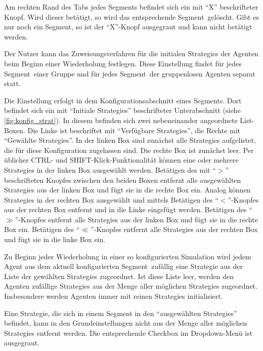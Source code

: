 \documentclass[parskip=full,11pt]{scrartcl}
\def\segment{Segment}
\begin{document}
Am rechten Rand des Tabs jedes \segment s befindet sich ein mit \enquote{X} beschrifteter Knopf. Wird dieser betätigt, so wird das entsprechende \segment\ gelöscht. Gibt es nur noch ein \segment, so ist der \enquote{X}-Knopf ausgegraut und kann nicht betätigt werden.

Der \Gls{Nutzer} kann das Zuweisungsverfahren für die initialen \Glspl{Strategie} der Agenten beim Beginn einer Wiederholung festlegen. Diese Einstellung findet für jedes \segment\ einer Gruppe und für jedes \segment\ der gruppenlosen Agenten separat statt.

Die Einstellung erfolgt in dem Konfigurationsabschnitt eines \segment s. Dort befindet sich ein mit \enquote{Initiale \Glspl{Strategie}} beschrifteter Unterabschnitt (siehe \cref{fig:konfig_strat}). In diesem befinden sich zwei nebeneinander angeordnete List-Boxen. Die Linke ist beschriftet mit \enquote{Verfügbare \Glspl{Strategie}}, die Rechte mit \enquote{Gewählte \Glspl{Strategie}}. In der linken Box sind zunächst alle \Glspl{Strategie} aufgelistet, die für diese \Gls{Konfiguration} zugelassen sind. Die rechte Box ist zunächst leer. Per üblicher \textsf{CTRL}- und \textsf{SHIFT}-Klick-Funktionalität können eine oder mehrere \Glspl{Strategie} in der linken Box ausgewählt werden. Betätigen des mit \enquote{\(>\)} beschrifteten Knopfes zwischen den beiden Boxen entfernt alle ausgewählten \Glspl{Strategie} aus der linken Box und fügt sie in die rechte Box ein. Analog können \Glspl{Strategie} in der rechten Box ausgewählt und mittels Betätigen des \enquote{\(<\)}-Knopfes aus der rechten Box entfernt und in die Linke eingefügt werden. Betätigen des \enquote{\(\gg\)}-Knopfes entfernt alle \Glspl{Strategie} aus der linken Box und fügt sie in die rechte Box ein. Betätigen des \enquote{\(\ll\)}-Knopfes entfernt alle \Glspl{Strategie} aus der rechten Box und fügt sie in die linke Box ein.

Zu Beginn jeder Wiederholung in einer so konfigurierten Simulation wird jedem Agent aus dem aktuell konfigurierten \segment\ zufällig eine \Gls{Strategie} aus der Liste der gewählten \Glspl{Strategie} zugeordnet. Ist diese Liste leer, werden den Agenten zufällige \Glspl{Strategie} aus der Menge aller möglichen \Glspl{Strategie} zugeordnet. Insbesondere werden Agenten immer mit reinen \Glspl{Strategie} initialisiert.

Eine \Gls{Strategie}, die sich in einem Segment in den \enquote{ausgewählten \Glspl{Strategie}} befindet, kann in den Grundeinstellungen nicht aus der Menge aller möglichen \Glspl{Strategie} entfernt werden. Die entsprechende Checkbox im Dropdown-Menü ist ausgegraut.
\end{document}
